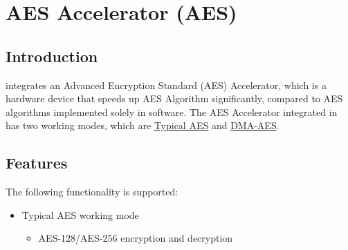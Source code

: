 \documentclass[main\_\_EN.tex]{subfiles}
\begin{document}

\ifglobal
\else
    {\let\clearpage\relax \listoftodos}
    \tableofcontents
\fi



\hypertarget{aes}{}
\chapter{AES Accelerator (AES)}\label{mod:aes}

\section{Introduction}

\chipname{} integrates an Advanced Encryption Standard (AES) Accelerator, which is a hardware device that speeds up AES Algorithm significantly, compared to AES algorithms implemented solely in software. The AES Accelerator integrated in \chipname{} has two working modes, which are \hyperref[sec:aes-typical-modes]{Typical AES} and \hyperref[sec:aes-dma-aes]{DMA-AES}.

\section{Features}

The following functionality is supported:
\begin{itemize}
    \item Typical AES working mode
        \begin{itemize}
            \item AES-128/AES-256 encryption and decryption
        \end{itemize}
    \end{itemize}
    
\end{document}
